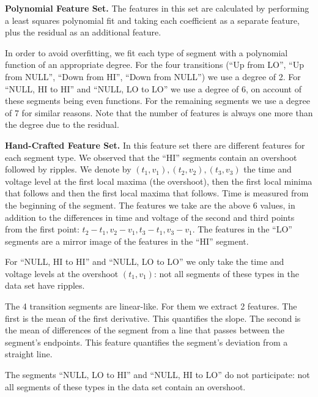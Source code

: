 \documentclass[english]{llncs}
\begin{document}
{\bf Polynomial Feature Set.}
  The features in this set are calculated by performing a least squares polynomial fit and taking each coefficient as a separate feature, plus the residual as an additional feature.
  
  In order to avoid overfitting, we fit each type of segment with a polynomial function of an appropriate degree. For the four transitions (``Up from LO'', ``Up from NULL'', ``Down from HI'', ``Down from NULL'') we use a degree of 2. For ``NULL, HI to HI'' and ``NULL, LO to LO'' we use a degree of 6, on account of these segments being even functions. For the remaining segments we use a degree of 7 for similar reasons. Note that the number of features is always one more than the degree due to the residual.
  
{\bf Hand-Crafted Feature Set.}
  In this feature set there are different features for each segment type.
  We observed that the ``HI'' segments contain an overshoot followed by ripples. We denote by \((t_1, v_1), (t_2, v_2), (t_3, v_3)\) the time and voltage level at the first local maxima (the overshoot), then the first local minima that follows and then the first local maxima that follows. Time is measured from the beginning of the segment. The features we take are the above 6 values, in addition to the differences in time and voltage of the second and third points from the first point: \(t_2-t_1, v_2-v_1, t_3-t_1, v_3-v_1\). The features in the ``LO'' segments are a mirror image of the features in the ``HI'' segment.
  
  For ``NULL, HI to HI'' and ``NULL, LO to LO'' we only take the time and voltage levels at the overshoot \((t_1, v_1)\): not all segments of these types in the data set have ripples.
  
  The 4 transition segments are linear-like. For them we extract 2 features. The first is the mean of the first derivative. This quantifies the slope. The second
  is the mean of differences of the segment from a line that passes between the segment's endpoints. This feature quantifies the
  segment's deviation
  from a straight line.
  
  The segments ``NULL, LO to HI'' and ``NULL, HI to LO'' do not participate: not all segments of these types in the data set contain an overshoot.
  
\end{document}
